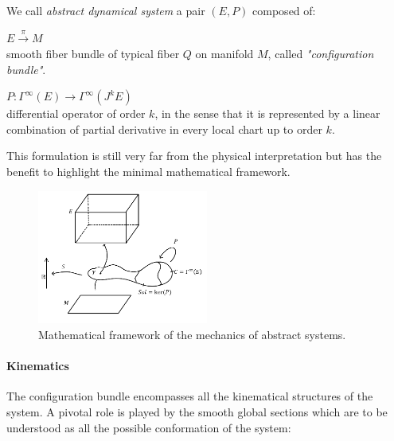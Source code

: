 \documentclass[Main]{subfiles}
\begin{document}
	\begin{definition}\label{Def:AbstracDynamicalSystem}
		We call \emph{abstract dynamical system} 
		a pair $(E,P )$ composed of:
		\begin{compactitemize}
			\item $E \xrightarrow{\pi} M$ \\
			smooth fiber bundle of typical fiber $Q$ on  manifold $M$, called \emph{"configuration bundle"}.
			\item	$ P : \Gamma^\infty(E) \rightarrow \Gamma^\infty(J^kE)$ \\
			differential operator of order $k$,%
			in the sense that it is represented by a linear combination of partial derivative in every local chart up to order $k$.
		\end{compactitemize}
	\end{definition}
	This formulation is still very far from the physical interpretation but has the benefit to highlight the minimal mathematical framework.
	\begin{figure}[h!]
		\centering
		\includegraphics[width=0.5\textwidth]{Pictures/AbstractFieldTheory} 
		 	 	\caption{Mathematical framework of the mechanics of abstract systems. }
	\end{figure}		
	
	\paragraph{Kinematics}
	The configuration bundle encompasses all the kinematical structures of the system.
	 A pivotal role is played by the smooth global sections  which are to be understood as all the possible conformation of the system:
\end{document}
